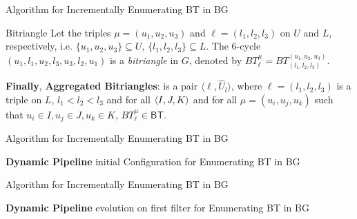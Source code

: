 \begin{frame}[fragile]{Algorithm for Incrementally Enumerating BT in BG}
  \begin{block}{Bitriangle}    
    Let the triples $\mu=(u_1, u_2, u_3)$ and $\ell=(l_1, l_2,l_3)$ on $U$ and $L$, respectively, i.e.  $\{u_1, u_2, u_3\} \subseteq U$, $\{l_1, l_2,l_3\} \subseteq L$. 
    The 6-cycle $(u_1,l_1,u_2,l_3,u_3,l_2,u_1)$  is a \textit{bitriangle} in $G$, denoted by $BT_{\ell}^{\mu} = BT_{(l_1, l_2,l_3)}^{(u_1, u_2, u_3)}$. \\
  \end{block}
  \begin{center}
    \textbf{Finally}, \textbf{Aggregated Bitriangles}: is a pair  $\langle \ell, \hat{U}_l\rangle$, 
    where $\ell=(l_1, l_2, l_3)$ is a triple on $L$, $l_1 < l_2 < l_3$ and for all $\left\langle I, J, K\right\rangle$ and for all $\mu=(u_i, u_j, u_k)$ such that $u_i \in I, u_j \in J, u_k \in K$, $BT_{\ell}^{\mu} \in \mathsf{BT}$.
  \end{center}    
  \begin{figure}
    \centering
  \end{figure}
\end{frame}


\begin{frame}[fragile]{Algorithm for Incrementally Enumerating BT in BG}
  \begin{center}
    \textbf{Dynamic Pipeline} initial Configuration for Enumerating BT in BG
  \end{center}    
  \begin{figure}
    \centering  
  \end{figure}
\end{frame}

\begin{frame}[fragile]{Algorithm for Incrementally Enumerating BT in BG}
  \begin{center}
    \textbf{Dynamic Pipeline} evolution on first filter for Enumerating BT in BG
  \end{center}    
  \begin{figure}
    \centering  
  \end{figure}
\end{frame}

